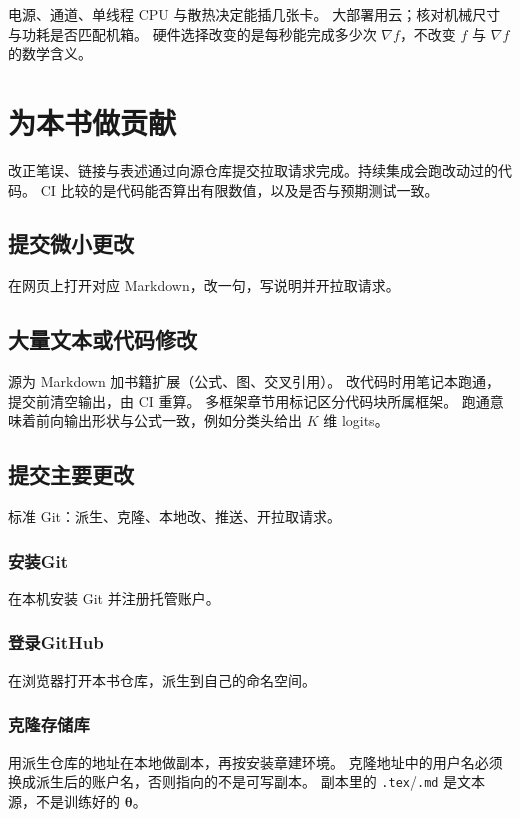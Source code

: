 电源、通道、单线程 CPU 与散热决定能插几张卡。
大部署用云；核对机械尺寸与功耗是否匹配机箱。
硬件选择改变的是每秒能完成多少次 $\nabla f$，不改变 $f$ 与 $\nabla f$ 的数学含义。

\section{为本书做贡献}

改正笔误、链接与表述通过向源仓库提交拉取请求完成。持续集成会跑改动过的代码。
CI 比较的是代码能否算出有限数值，以及是否与预期测试一致。

\subsection{提交微小更改}

在网页上打开对应 Markdown，改一句，写说明并开拉取请求。

\subsection{大量文本或代码修改}

源为 Markdown 加书籍扩展（公式、图、交叉引用）。
改代码时用笔记本跑通，提交前清空输出，由 CI 重算。
多框架章节用标记区分代码块所属框架。
跑通意味着前向输出形状与公式一致，例如分类头给出 $K$ 维 logits。

\subsection{提交主要更改}

标准 Git：派生、克隆、本地改、推送、开拉取请求。

\subsubsection{安装Git}

在本机安装 Git 并注册托管账户。

\subsubsection{登录GitHub}

在浏览器打开本书仓库，派生到自己的命名空间。

\subsubsection{克隆存储库}

用派生仓库的地址在本地做副本，再按安装章建环境。
克隆地址中的用户名必须换成派生后的账户名，否则指向的不是可写副本。
副本里的 \texttt{.tex}/\texttt{.md} 是文本源，不是训练好的 $\bm{\theta}$。

